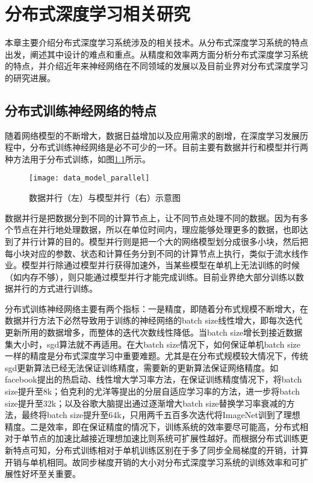 \chapter{分布式深度学习相关研究}
本章主要介绍分布式深度学习系统涉及的相关技术。从分布式深度学习系统的特点出发，阐述其中设计的难点和重点。从精度和效率两方面分析分布式深度学习系统的特点，并介绍近年来神经网络在不同领域的发展以及目前业界对分布式深度学习的研究进展。
\section{分布式训练神经网络的特点}
随着网络模型的不断增大，数据日益增加以及应用需求的剧增，在深度学习发展历程中，分布式训练神经网络是必不可少的一环。目前主要有数据并行和模型并行两种方法用于分布式训练，如图\ref{fig:data_model_parallel}所示。

\begin{figure}[htp]
\centering
\texttt{[image: data\_model\_parallel]}
\caption{数据并行（左）与模型并行（右）示意图}
\label{fig:data_model_parallel}
\end{figure}
数据并行是把数据分到不同的计算节点上，让不同节点处理不同的数据。因为有多个节点在并行地处理数据，所以在单位时间内，理应能够处理更多的数据，也即达到了并行计算的目的。模型并行则是把一个大的网络模型划分成很多小块，然后把每小块对应的参数、状态和计算任务分到不同的计算节点上执行，类似于流水线作业。模型并行除通过模型并行获得加速外，当某些模型在单机上无法训练的时候（如内存不够），则只能通过模型并行才能完成训练。目前业界绝大部分训练以数据并行的方式进行训练。

分布式训练神经网络主要有两个指标：一是精度，即随着分布式规模不断增大，在数据并行方法下必然导致用于训练的神经网络的batch size线性增大，即每次迭代更新所用的数据增多，而整体的迭代次数线性降低。当batch size增长到接近数据集大小时，sgd算法就不再适用。在大batch size情况下，如何保证单机batch size一样的精度是分布式深度学习中重要难题。尤其是在分布式规模较大情况下，传统sgd更新算法已经无法保证训练精度，需要新的更新算法保证网络精度。如facebook提出的热启动、线性增大学习率方法，在保证训练精度情况下，将batch size提升至8k；伯克利的尤洋等提出的分层自适应学习率的方法，进一步将batch size提升至32k；以及谷歌大脑提出通过逐渐增大batch size替换学习率衰减的方法，最终将batch size提升至64k，只用两千五百多次迭代将ImageNet训到了理想精度。二是效率，即在保证精度的情况下，训练系统的效率要尽可能高，分布式相对于单节点的加速比越接近理想加速比则系统可扩展性越好。而根据分布式训练更新特点可知，分布式训练相对于单机训练区别在于多了同步全局梯度的开销，计算开销与单机相同。故同步梯度开销的大小对分布式深度学习系统的训练效率和可扩展性好坏至关重要。

